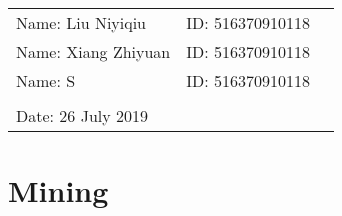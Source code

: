 \documentclass[12pt,a4paper]{article}
\begin{document}
\vspace*{0.25cm}

\hrulefill

\thispagestyle{empty}

\begin{center}
\begin{large}
\end{large}

\hrulefill

\vspace*{5cm}
\begin{Large}
\end{Large}

\vspace{2em}

\begin{large}
\end{large}
\end{center}


\vfill

\begin{table}[h!]
\flushleft
\begin{tabular}{lll}
Name: Liu Niyiqiu \hspace*{2em}&
ID: 516370910118\hspace*{2em}
\\
Name: Xiang Zhiyuan \hspace*{2em}&
ID: 516370910118\hspace*{2em}
\\
Name: S \hspace*{2em}&
ID: 516370910118\hspace*{2em}
\\


\\

Date: 26 July 2019
\end{tabular}
\end{table}

\hfill

\newpage
\tableofcontents
\newpage

\section{Mining}
\end{document}
